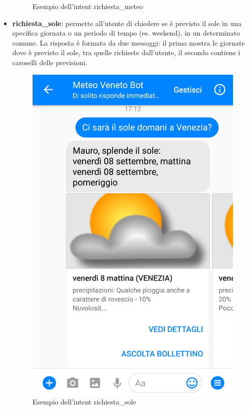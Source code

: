 \begin{itemize}
\begin{figure}[h]
		\caption{Esempio dell'intent richiesta\_meteo}
	\end{figure}	
\newpage
	\item \textbf{richiesta\_sole}: permette all'utente di chiedere se è previsto il sole in una specifica giornata o un periodo di tempo (es. weekend), in un determinato comune. La risposta è formata da due messaggi: il primo mostra le giornate dove è previsto il sole, tra quelle richieste dall'utente, il secondo contiene i caroselli delle previsioni.
	\begin{figure}[!h]
		\centering
		\includegraphics[scale=0.15]{../Immagini/richiesta_sole.png}
		\caption{Esempio dell'intent richiesta\_sole}
	\end{figure}	

\end{itemize}
